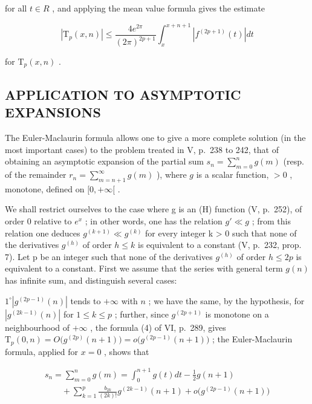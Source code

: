 for all \(t \in R\) , and applying the mean value formula gives the estimate

\[
\left| \mathrm{T} _ {p} (x, n) \right| \leqslant \frac {4 e ^ {2 \pi}}{(2 \pi) ^ {2 p + 1}} \int_ {x} ^ {x + n + 1} \left| f ^ {(2 p + 1)} (t) \right| d t\tag{4}
\]

for \(\mathrm{T}_p(x,n)\) .

\subsection{APPLICATION TO ASYMPTOTIC EXPANSIONS}

The Euler-Maclaurin formula allows one to give a more complete solution (in the most important cases) to the problem treated in V, p.~238 to 242, that of obtaining an asymptotic expansion of the partial sum \(s_n = \sum_{m=0}^{n} g(m)\) (resp. of the remainder \(r_n = \sum_{m=n+1}^{\infty} g(m)\) ), where \(g\) is a scalar function, \(> 0\) , monotone, defined on \([0, +\infty[\) .

We shall restrict ourselves to the case where g is an (H) function (V, p.~252), of order 0 relative to \(e^{x}\) ; in other words, one has the relation \(g' \ll g\) ; from this relation one deduces \(g^{(k+1)} \ll g^{(k)}\) for every integer k \textgreater{} 0 such that none of the derivatives \(g^{(h)}\) of order \(h \leqslant k\) is equivalent to a constant (V, p.~232, prop. 7). Let p be an integer such that none of the derivatives \(g^{(h)}\) of order \(h \leqslant 2p\) is equivalent to a constant. First we assume that the series with general term \(g(n)\) has infinite sum, and distinguish several cases:

\(1^{\circ}\left|g^{(2p - 1)}(n)\right|\) tends to \(+\infty\) with \(n\) ; we have the same, by the hypothesis, for \(\left|g^{(2k - 1)}(n)\right|\) for \(1\leqslant k\leqslant p\) ; further, since \(g^{(2p + 1)}\) is monotone on a neighbourhood of \(+\infty\) , the formula (4) of VI, p.~289, gives \(\mathrm{T}_p(0,n) = O\big(g^{(2p)}(n + 1)\big) = o\big(g^{(2p - 1)}(n + 1)\big)\) ; the Euler-Maclaurin formula, applied for \(x = 0\) , shows that

\[
\begin{array}{l} s _ {n} = \sum_ {m = 0} ^ {n} g (m) = \int_ {0} ^ {n + 1} g (t) d t - \frac {1}{2} g (n + 1) \\ \qquad + \sum_ {k = 1} ^ {p} \frac {b _ {2 k}}{(2 k) !} g ^ {(2 k - 1)} (n + 1) + o \big (g ^ {(2 p - 1)} (n + 1) \big) \end{array}
\]

